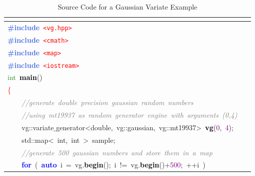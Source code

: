 \begin{small}
\begin{ttfamily}

\begin{center}
\begin{longtable}{|l|}
\caption{Source Code for a Gaussian Variate Example} \\
\label{code:gauss} \\
\hline
\mbox{}\textbf{\textcolor{RoyalBlue}{\#include}}\ \texttt{\textcolor{Red}{\textless{}vg.hpp\textgreater{}}} \\
\mbox{}\textbf{\textcolor{RoyalBlue}{\#include}}\ \texttt{\textcolor{Red}{\textless{}cmath\textgreater{}}} \\
\mbox{}\textbf{\textcolor{RoyalBlue}{\#include}}\ \texttt{\textcolor{Red}{\textless{}map\textgreater{}}} \\
\mbox{}\textbf{\textcolor{RoyalBlue}{\#include}}\ \texttt{\textcolor{Red}{\textless{}iostream\textgreater{}}} \\
\mbox{}\textcolor{ForestGreen}{int}\ \textbf{\textcolor{Black}{main}}\textcolor{BrickRed}{()} \\
\mbox{}\textcolor{Red}{\{} \\
\mbox{}\ \ \ \ \textit{\textcolor{Gray}{//generate\ double\ precision\ gaussian\ random\ numbers}} \\
\mbox{}\ \ \ \ \textit{\textcolor{Gray}{//using\ mt19937\ as\ random\ generator\ engine\ with\ arguments\ (0,4)}} \\
\mbox{}\ \ \ \ vg\textcolor{BrickRed}{::}\textcolor{TealBlue}{variate$\_$generator\textless{}double,\ vg::gaussian,\ vg::mt19937\textgreater{}}\ \textbf{\textcolor{Black}{vg}}\textcolor{BrickRed}{(}\textcolor{Purple}{0}\textcolor{BrickRed}{,}\ \textcolor{Purple}{4}\textcolor{BrickRed}{);}\ \ \ \  \\
\mbox{}\ \ \ \ std\textcolor{BrickRed}{::}\textcolor{TealBlue}{map\textless{}\ int,\ int\ \textgreater{}}\ sample\textcolor{BrickRed}{;} \\
\mbox{}\ \ \ \ \textit{\textcolor{Gray}{//generate\ 500\ gaussian\ numbers\ and\ store\ them\ in\ a\ map}} \\
\mbox{}\ \ \ \ \textbf{\textcolor{Blue}{for}}\ \textcolor{BrickRed}{(}\ \textbf{\textcolor{Blue}{auto}}\ i\ \textcolor{BrickRed}{=}\ vg\textcolor{BrickRed}{.}\textbf{\textcolor{Black}{begin}}\textcolor{BrickRed}{();}\ i\ \textcolor{BrickRed}{!=}\ vg\textcolor{BrickRed}{.}\textbf{\textcolor{Black}{begin}}\textcolor{BrickRed}{()+}\textcolor{Purple}{500}\textcolor{BrickRed}{;}\ \textcolor{BrickRed}{++}i\ \textcolor{BrickRed}{)} \\

\end{longtable}
\end{center}
\end{ttfamily}
\end{small}
